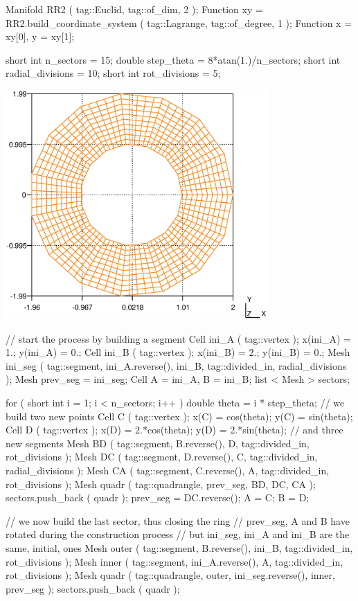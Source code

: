 {\verbatim
   Manifold RR2 ( tag::Euclid, tag::of_dim, 2 );
   Function xy = RR2.build_coordinate_system ( tag::Lagrange, tag::of_degree, 1 );
   Function x = xy[0],  y = xy[1];

   short int n_sectors = 15;
   double step_theta = 8*atan(1.)/n_sectors;
   short int radial_divisions = 10;
   short int rot_divisions = 5;
\endverbatim
   
\centerline{\includegraphics[width=10cm]{ring.eps}}

\verbatim
   // start the process by building a segment
   Cell ini_A ( tag::vertex );  x(ini_A) = 1.;  y(ini_A) = 0.;
   Cell ini_B ( tag::vertex );  x(ini_B) = 2.;  y(ini_B) = 0.;
   Mesh ini_seg ( tag::segment, ini_A.reverse(), ini_B,
                  tag::divided_in, radial_divisions     );
   Mesh prev_seg = ini_seg;
   Cell A = ini_A,  B = ini_B;
   list < Mesh > sectors;

   for ( short int i = 1; i < n_sectors; i++ )
   {  double theta = i * step_theta;
      // we build two new points
      Cell C ( tag::vertex ); x(C) = cos(theta);    y(C) = sin(theta);
      Cell D ( tag::vertex ); x(D) = 2.*cos(theta); y(D) = 2.*sin(theta);
      // and three new segments
      Mesh BD ( tag::segment, B.reverse(), D, tag::divided_in, rot_divisions );
      Mesh DC ( tag::segment, D.reverse(), C, tag::divided_in, radial_divisions );
      Mesh CA ( tag::segment, C.reverse(), A, tag::divided_in, rot_divisions );
      Mesh quadr ( tag::quadrangle, prev_seg, BD, DC, CA );
      sectors.push_back ( quadr );
      prev_seg = DC.reverse();
      A = C;  B = D;                                                     }

   // we now build the last sector, thus closing the ring
   // prev_seg, A and B have rotated during the construction process
   // but ini_seg, ini_A and ini_B are the same, initial, ones
   Mesh outer ( tag::segment, B.reverse(), ini_B, tag::divided_in, rot_divisions );
   Mesh inner ( tag::segment, ini_A.reverse(), A, tag::divided_in, rot_divisions );
   Mesh quadr ( tag::quadrangle, outer, ini_seg.reverse(), inner, prev_seg );
   sectors.push_back ( quadr );
   
}
